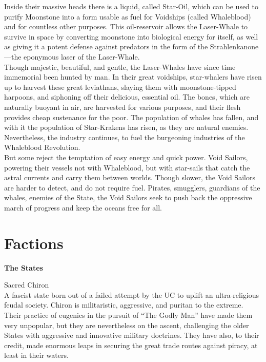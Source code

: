 \documentclass[a4paper, twocolumn, openany]{book}
\begin{document}
{	Inside their massive heads there is a liquid, called Star-Oil, which can be used to purify
	Moonstone into a form usable as fuel for Voidships (called Whaleblood) and for countless other
	purposes. This oil-reservoir allows the Laser-Whale to survive in space by converting
	moonstone into biological energy for itself, as well as giving it a potent defense against
	predators in the form of the Strahlenkanone—the eponymous laser of the Laser-Whale.\\

	Though majestic, beautiful, and gentle, the Laser-Whales have since time immemorial been
	hunted by man. In their great voidships, star-whalers have risen up to harvest these great
	leviathans, slaying them with moonstone-tipped harpoons, and siphoning off their delicious,
	essential oil. The bones, which are naturally buoyant in air, are harvested for various purposes,
	and their flesh provides cheap sustenance for the poor. The population of whales has fallen,
	and with it the population of Star-Krakens has risen, as they are natural enemies. Nevertheless,
	the industry continues, to fuel the burgeoning industries of the Whaleblood Revolution.\\

	But some reject the temptation of easy energy and quick power. Void Sailors, powering their
	vessels not with Whaleblood, but with star-sails that catch the astral currents and carry them
	between worlds. Though slower, the Void Sailors are harder to detect, and do not require fuel.
	Pirates, smugglers, guardians of the whales, enemies of the State, the Void Sailors seek to
	push back the oppressive march of progress and keep the oceans free for all.\\

\newpage
\noindent
\section{Factions}

	\noindent
	{\large\bfseries The States\\}

	{\large Sacred Chiron\\}
	A fascist state born out of a failed attempt by the UC to uplift an ultra-religious feudal society.
	Chiron is militaristic, aggressive, and puritan to the extreme. Their practice of eugenics in the
	pursuit of “The Godly Man” have made them very unpopular, but they are nevertheless on the
	ascent, challenging the older States with aggressive and innovative military doctrines. They
	have also, to their credit, made enormous leaps in securing the great trade routes against
	piracy, at least in their waters.\\

}
\end{document}
